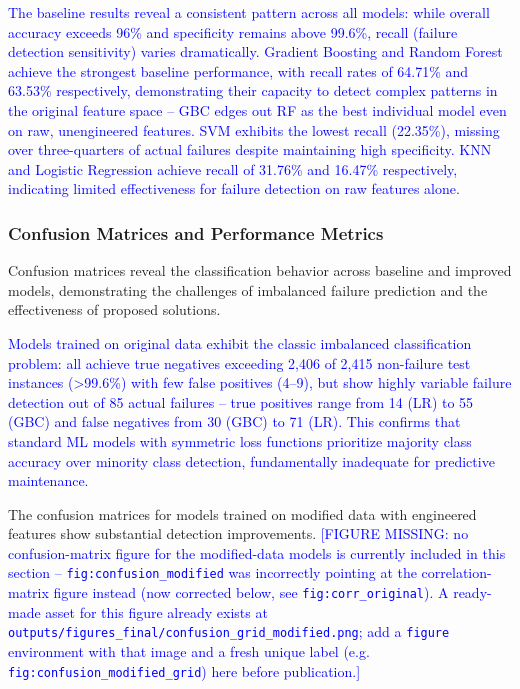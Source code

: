 \textcolor{blue}{The baseline results reveal a consistent pattern across all models: while overall accuracy exceeds 96\% and specificity remains above 99.6\%, recall (failure detection sensitivity) varies dramatically. Gradient Boosting and Random Forest achieve the strongest baseline performance, with recall rates of 64.71\% and 63.53\% respectively, demonstrating their capacity to detect complex patterns in the original feature space -- GBC edges out RF as the best individual model even on raw, unengineered features. SVM exhibits the lowest recall (22.35\%), missing over three-quarters of actual failures despite maintaining high specificity. KNN and Logistic Regression achieve recall of 31.76\% and 16.47\% respectively, indicating limited effectiveness for failure detection on raw features alone.}

\subsubsection{Confusion Matrices and Performance Metrics}

Confusion matrices reveal the classification behavior across baseline and improved models, demonstrating the challenges of imbalanced failure prediction and the effectiveness of proposed solutions.

\textcolor{blue}{Models trained on original data exhibit the classic imbalanced classification problem: all achieve true negatives exceeding 2,406 of 2,415 non-failure test instances (>99.6\%) with few false positives (4--9), but show highly variable failure detection out of 85 actual failures -- true positives range from 14 (LR) to 55 (GBC) and false negatives from 30 (GBC) to 71 (LR). This confirms that standard ML models with symmetric loss functions prioritize majority class accuracy over minority class detection, fundamentally inadequate for predictive maintenance.}

The confusion matrices for models trained on modified data with engineered features show substantial detection improvements. \textcolor{blue}{[FIGURE MISSING: no confusion-matrix figure for the modified-data models is currently included in this section -- \texttt{fig:confusion\_modified} was incorrectly pointing at the correlation-matrix figure instead (now corrected below, see \texttt{fig:corr\_original}). A ready-made asset for this figure already exists at \texttt{outputs/figures\_final/confusion\_grid\_modified.png}; add a \texttt{figure} environment with that image and a fresh unique label (e.g. \texttt{fig:confusion\_modified\_grid}) here before publication.]}



